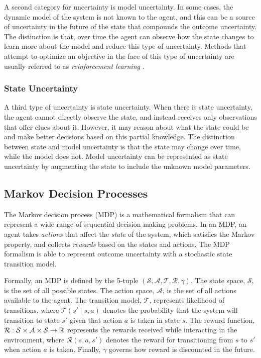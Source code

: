 A second category for uncertainty is model uncertainty.
In some cases, the dynamic model of the system is not known to the agent, and this can be a source of uncertainty in the future of the state that compounds the outcome uncertainty.
The distinction is that, over time the agent can observe how the state changes to learn more about the model and reduce this type of uncertainty.
Methods that attempt to optimize an objective in the face of this type of uncertainty are usually referred to as \emph{reinforcement learning} \cite{RSS-AGB:98}.

\subsubsection{State Uncertainty}

A third type of uncertainty is state uncertainty.
When there is state uncertainty, the agent cannot directly observe the state, and instead receives only observations that offer clues about it.
However, it may reason about what the state could be and make better decisions based on this partial knowledge.
The distinction between state and model uncertainty is that the state may change over time, while the model does not.
Model uncertainty can be represented as state uncertainty by augmenting the state to include the unknown model parameters.

\subsection{Markov Decision Processes} \label{sec:mdps}

The Markov decision process (MDP) is a mathematical formalism that can represent a wide range of sequential decision making problems. 
In an MDP, an agent takes \emph{actions} that affect the \emph{state} of the system, which satisfies the Markov property, and collects \emph{rewards} based on the states and actions.
The MDP formalism is able to represent outcome uncertainty with a stochastic state transition model.

Formally, an MDP is defined by the 5-tuple $(\mathcal{S}, \mathcal{A}, \mathcal{T}, \mathcal{R}, \gamma)$.
The state space, $\mathcal{S}$, is the set of all possible states.
The action space, $\mathcal{A}$, is the set of all actions available to the agent.
The transition model, $\mathcal{T}$, represents likelihood of transitions, where $\mathcal{T}(s' \mid s, a)$ denotes the probability that the system will transition to state $s'$ given that action $a$ is taken in state $s$.
The reward function, $\mathcal{R}: \mathcal{S} \times \mathcal{A} \times \mathcal{S} \to \mathbb{R}$ represents the rewards received while interacting in the environment, where
$\mathcal{R}(s, a, s')$ denotes the reward for transitioning from $s$ to $s'$ when action $a$ is taken.
Finally, $\gamma$ governs how reward is discounted in the future.

